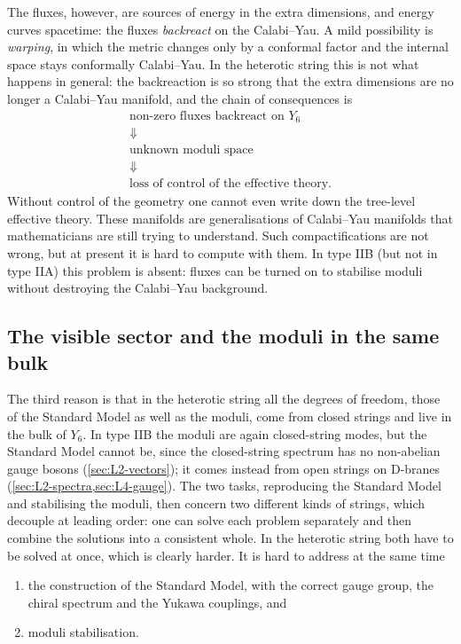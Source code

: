 The fluxes, however, are sources of energy in the extra dimensions, and energy curves spacetime: the fluxes \emph{backreact} on the Calabi--Yau. A mild possibility is \emph{warping}, in which the metric changes only by a conformal factor and the internal space stays conformally Calabi--Yau. In the heterotic string this is not what happens in general: the backreaction is so strong that the extra dimensions are no longer a Calabi--Yau manifold, and the chain of consequences is
\begin{equation*}
  \begin{gathered}
    \text{non-zero fluxes backreact on } Y_6\\[-0.3ex]
    \Downarrow\\[-0.3ex]
    \text{unknown moduli space}\\[-0.3ex]
    \Downarrow\\[-0.3ex]
    \text{loss of control of the effective theory.}
  \end{gathered}
\end{equation*}
Without control of the geometry one cannot even write down the tree-level effective theory. These manifolds are generalisations of Calabi--Yau manifolds that mathematicians are still trying to understand. Such compactifications are not wrong, but at present it is hard to compute with them. In type IIB (but not in type IIA) this problem is absent: fluxes can be turned on to stabilise moduli without destroying the Calabi--Yau background.

\subsection{The visible sector and the moduli in the same bulk}

The third reason is that in the heterotic string all the degrees of freedom, those of the Standard Model as well as the moduli, come from closed strings and live in the bulk of $Y_6$. In type IIB the moduli are again closed-string modes, but the Standard Model cannot be, since the closed-string spectrum has no non-abelian gauge bosons (\cref{sec:L2-vectors}); it comes instead from open strings on D-branes (\cref{sec:L2-spectra,sec:L4-gauge}). The two tasks, reproducing the Standard Model and stabilising the moduli, then concern two different kinds of strings, which decouple at leading order: one can solve each problem separately and then combine the solutions into a consistent whole. In the heterotic string both have to be solved at once, which is clearly harder. It is hard to address at the same time
\begin{enumerate}
  \item the construction of the Standard Model, with the correct gauge group, the chiral spectrum and the Yukawa couplings, and
  \item moduli stabilisation.
\end{enumerate}

